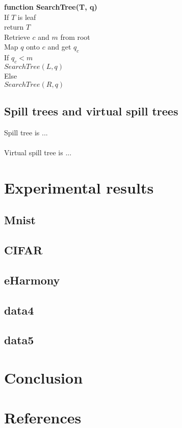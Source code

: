 \documentclass[paper=letter, fontsize=12pt]{article} %
\begin{document}
\hspace*{1em} \textbf{function SearchTree(T, q)}\\
\hspace*{2em} If $T$ is leaf\\
\hspace*{3em} return $T$\\
\hspace*{2em} Retrieve $c$ and $m$ from root\\
\hspace*{2em} Map $q$ onto $c$ and get $q_c$\\
\hspace*{2em} If $q_c < m$\\
\hspace*{3em} $SearchTree(L, q)$\\
\hspace*{2em} Else\\
\hspace*{3em} $SearchTree(R, q)$


\subsection{Spill trees and virtual spill trees}
Spill tree is ...
\\~\\
Virtual spill tree is ...

\section{Experimental results}
\subsection{Mnist}
\subsection{CIFAR}
\subsection{eHarmony}
\subsection{data4}
\subsection{data5}

\section{Conclusion}

\section{References}
\end{document}
